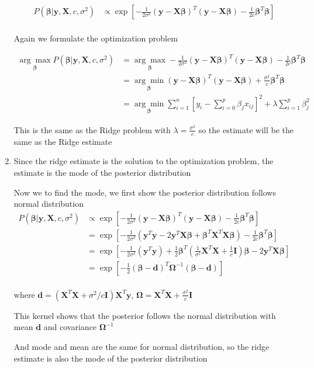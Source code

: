 \documentclass{article}
\newcommand{\vect}[1]{\boldsymbol{#1}}
\begin{document}
\begin{enumerate}[label=(\alph*)]
\begin{align*}
P(\vect \beta | \vect y,\vect X,c, \sigma^2) &\propto 
\exp [-\frac{1}{2\sigma^2} (\vect y - \vect X \vect \beta)^T(\vect y - \vect X \vect\beta) - \frac{1}{2c}\vect \beta^T\vect \beta ] \\
\end{align*}


Again we formulate the optimization problem

\begin{align*}
    \underset{\vect \beta}{\arg\max} P(\vect \beta | \vect y, \vect X, c, \sigma^2) 
    &= \underset{\vect \beta}{\arg\max} -\frac{1}{2\sigma^2} (\vect y - \vect X \vect \beta)^T(\vect y - \vect X \vect\beta) - \frac{1}{2c}\vect \beta^T \vect \beta  \\
    &= \underset{\vect \beta}{\arg\min} (\vect y - \vect X \vect \beta)^T(\vect y - \vect X \vect\beta) + \frac{\sigma^2}{c}\vect \beta^T \vect \beta  \\
    &= \underset{\vect \beta}{\arg\min} \sum_{i=1}^n \left[ y_i - \sum_{i=0}^p \beta_j x_{ij}\right]^2 + \lambda\sum_{i=1}^p \beta_j^2
\end{align*}

This is the same as the Ridge problem with \(\lambda = \frac{\sigma^2}{c}\) so the estimate will be the same as the Ridge estimate

\item
Since the ridge estimate is the solution to the optimization problem, the estimate is the mode of the posterior distribution

Now we to find the mode, we first show the posterior distribution follows normal distribution
\begin{align*}
P(\vect \beta | \vect y,\vect X,c, \sigma^2) &\propto 
\exp[-\frac{1}{2\sigma^2} (\vect y - \vect X \vect \beta)^T(\vect y - \vect X \vect\beta) - \frac{1}{2c}\vect \beta^T\vect \beta ]  \\
&= \exp[-\frac{1}{2\sigma^2}(\vect y^T\vect y - 2\vect y^T \vect X \vect \beta + \vect \beta^T \vect X^T \vect X \vect \beta) - \frac{1}{2c}\vect \beta^T\vect \beta ]\\
&= \exp[-\frac{1}{2\sigma^2}(\vect y^T\vect y) + \frac{1}{2}\vect \beta^T(\frac{1}{\sigma^2}\vect X^T \vect X + \frac{1}{c}\vect I)\vect \beta - 2\vect y^T \vect X \vect \beta] \\
&= \exp[-\frac{1}{2}(\vect \beta - \vect d)^T \vect \Omega^{-1}(\vect \beta - \vect d)] \\
\end{align*}

where \(\vect d = (\vect X^T \vect X + \sigma^2/c \vect I)\vect X^T \vect y\), \(\vect \Omega = \vect X^T \vect X + \frac{\sigma^2}{c}\vect I\)

This kernel shows that the posterior follows the normal distribution with mean \(\vect d\) and covariance \(\vect \Omega^{-1}\)

And mode and mean are the same for normal distribution, so the ridge estimate is also the mode of the posterior distribution

\end{enumerate}
\end{document}

